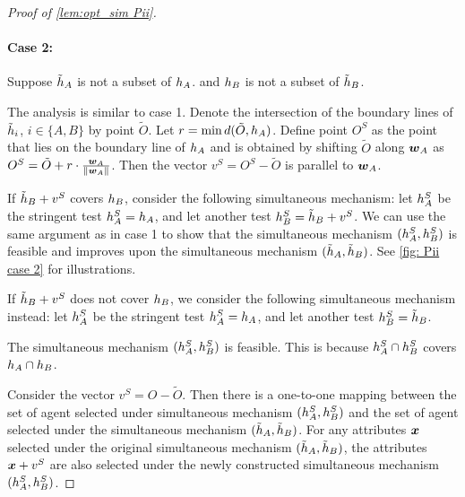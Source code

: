 \begin{proof}[Proof of \cref{lem:opt_sim Pii}]
\paragraph{Case 2:}  Suppose $\tilde{h}_A$ is not a subset of $h_A$.
    and $h_B$ is not a subset of $\tilde{h}_B$.
    
    The analysis is similar to case 1.
    Denote the intersection of the boundary lines of $\tilde{h}_i$, $i\in \{A,B\}$ by point $\tilde O$.
Let $r=\min d(\tilde O,h_A)$.
Define point $O^S$ as the point that lies on the boundary line of $h_A$ and is obtained by shifting $\tilde O$ along $\boldsymbol{w}_A$ as $O^S= \tilde O+r\cdot \frac{\boldsymbol{w}_A}{\lVert \boldsymbol{w}_A \rVert }$.
Then the vector $v^S = O^S- \tilde O$ is parallel to $\boldsymbol{w}_A$.

If $\tilde{h}_B+v^S$ covers $h_B$, 
consider the following simultaneous mechanism: 
    let $h_A^S$ be the stringent test $h_A^S=h_A$, and let another test $h_B^S =\tilde{h}_B+v^S$.
    We can use the same argument as in case 1 to show that  the simultaneous mechanism $(h_A^S,h_B^S)$ is feasible and improves upon the simultaneous mechanism $(\tilde{h}_A,\tilde{h}_B)$.
    See \cref{fig: Pii case 2} for illustrations.
    
If $\tilde{h}_B+v^S$ does not cover $h_B$, 
    we consider the following simultaneous mechanism instead: 
    let $h_A^S$ be the stringent test $h_A^S=h_A$, and let another test $h_B^S =\tilde{h}_B$.

    The simultaneous mechanism $(h_A^S,h_B^S)$ is feasible. This is because $h_A^S\cap h_B^S$  covers $h_A\cap h_B$.

 Consider the vector $v^S =O- \tilde O$.
    Then there is a one-to-one mapping between the set of agent selected under simultaneous mechanism $(h_A^S,h_B^S)$ and the set of agent selected under the simultaneous mechanism $(\tilde{h}_A,\tilde{h}_B)$.
    For any attributes $\boldsymbol{x}$ selected under the original simultaneous mechanism $(\tilde{h}_A,\tilde{h}_B)$, the attributes $\boldsymbol{x}+v^S$ are also selected under the newly constructed simultaneous mechanism $(h_A^S,h_B^S)$.
    

\end{proof}
